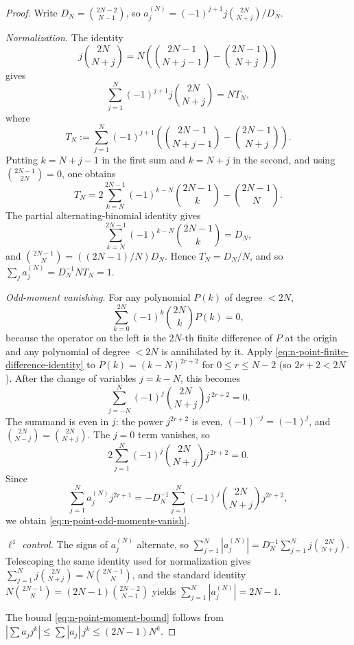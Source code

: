\documentclass[11pt,a4paper]{amsart}
\numberwithin{equation}{section}
\theoremstyle{plain}
\theoremstyle{definition}
\begin{document}
\begin{proof}
Write \(D_N=\binom{2N-2}{N-1}\), so
\(a_j^{(N)} = (-1)^{j+1} j \binom{2N}{N+j} / D_N\).

\emph{Normalization.}  The identity
\[
        j\binom{2N}{N+j}
        =N\left(\binom{2N-1}{N+j-1}-\binom{2N-1}{N+j}\right)
\]
gives
\[
\sum_{j=1}^N(-1)^{j+1}j\binom{2N}{N+j}
=N T_N,
\]
where
\[
T_N:=\sum_{j=1}^N(-1)^{j+1}
\left(\binom{2N-1}{N+j-1}-\binom{2N-1}{N+j}\right).
\]
Putting \(k=N+j-1\) in the first sum and \(k=N+j\) in the second,
and using \(\binom{2N-1}{2N}=0\), one obtains
\[
        T_N=2\sum_{k=N}^{2N-1}(-1)^{k-N}\binom{2N-1}{k}
             -\binom{2N-1}{N}.
\]
The partial alternating-binomial identity gives
\[
        \sum_{k=N}^{2N-1}(-1)^{k-N}\binom{2N-1}{k}=D_N,
\]
and
\(\binom{2N-1}{N}=((2N-1)/N)D_N\).  Hence \(T_N=D_N/N\), and so
\(\sum_j a_j^{(N)}=D_N^{-1}NT_N=1\).

\emph{Odd-moment vanishing.}  For any polynomial \(P(k)\) of degree
\(<2N\),
\begin{equation}
\label{eq:n-point-finite-difference-identity}
        \sum_{k=0}^{2N}(-1)^k\binom{2N}{k}P(k) = 0,
\end{equation}
because the operator on the left is the \(2N\)-th finite difference of
\(P\) at the origin and any polynomial of degree \(<2N\) is annihilated
by it.  Apply \eqref{eq:n-point-finite-difference-identity} to
\(P(k)=(k-N)^{2r+2}\) for \(0\le r\le N-2\) (so \(2r+2 < 2N\)).  After
the change of variables \(j=k-N\), this becomes
\[
        \sum_{j=-N}^N(-1)^j\binom{2N}{N+j}j^{\,2r+2}=0.
\]
The summand is even in \(j\): the power \(j^{2r+2}\) is even,
\((-1)^{-j}=(-1)^j\), and
\(\binom{2N}{N-j}=\binom{2N}{N+j}\).  The \(j=0\) term vanishes, so
\[
        2\sum_{j=1}^N(-1)^j\binom{2N}{N+j}j^{\,2r+2}=0.
\]
Since
\[
        \sum_{j=1}^N a_j^{(N)}j^{2r+1}
        =-D_N^{-1}
          \sum_{j=1}^N(-1)^j\binom{2N}{N+j}j^{2r+2},
\]
we obtain \eqref{eq:n-point-odd-moments-vanish}.

\emph{\(\ell^1\) control.}  The signs of \(a_j^{(N)}\) alternate, so
\(\sum_{j=1}^N|a_j^{(N)}| = D_N^{-1}\sum_{j=1}^N j\binom{2N}{N+j}\).
Telescoping the same identity used for normalization gives
\(\sum_{j=1}^N j\binom{2N}{N+j}=N\binom{2N-1}{N}\), and the standard
identity \(N\binom{2N-1}{N}=(2N-1)\binom{2N-2}{N-1}\) yields
\(\sum_{j=1}^N|a_j^{(N)}|=2N-1\).

The bound \eqref{eq:n-point-moment-bound} follows from
\(|\sum a_j j^k| \le \sum|a_j|\,j^k \le (2N-1)N^k\).
\end{proof}
\end{document}
